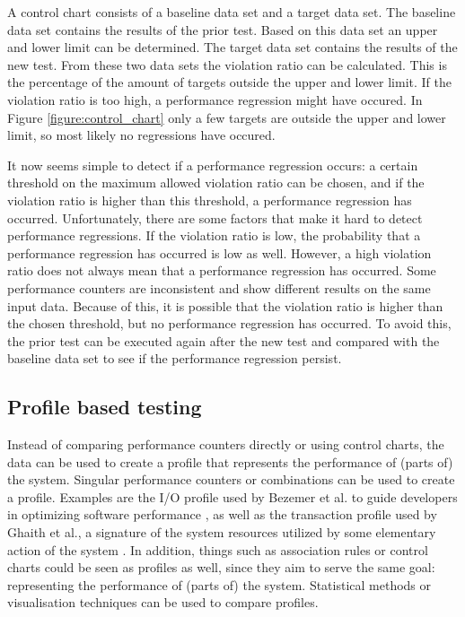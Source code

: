 A control chart consists of a baseline data set and a target data set. The baseline data set contains the results of the prior test. Based on this data set an upper and lower limit can be determined. The target data set contains the results of the new test. From these two data sets the violation ratio can be calculated. This is the percentage of the amount of targets outside the upper and lower limit. If the violation ratio is too high, a performance regression might have occured. In Figure \ref{figure:control_chart} only a few targets are outside the upper and lower limit, so most likely no regressions have occured.

It now seems simple to detect if a performance regression occurs: a certain threshold on the maximum allowed violation ratio can be chosen, and if the violation ratio is higher than this threshold, a performance regression has occurred. Unfortunately, there are some factors that make it hard to detect performance regressions. If the violation ratio is low, the probability that a performance regression has occurred is low as well. However, a high violation ratio does not always mean that a performance regression has occurred. Some performance counters are inconsistent and show different results on the same input data. Because of this, it is possible that the violation ratio is higher than the chosen threshold, but no performance regression has occurred. To avoid this, the prior test can be executed again after the new test and compared with the baseline data set to see if the performance regression persist.

\subsection{Profile based testing}
Instead of comparing performance counters directly or using control charts, the data can be used to create a profile that represents the performance of (parts of) the system. Singular performance counters or combinations can be used to create a profile. Examples are the I/O profile used by Bezemer et al. to guide developers in optimizing software performance \cite{bezemer2014detecting}, as well as the transaction profile used by Ghaith et al., a signature of the system resources utilized by some elementary action of the system \cite{ghaith2013profile}. In addition, things such as association rules or control charts could be seen as profiles as well, since they aim to serve the same goal: representing the performance of (parts of) the system. Statistical methods or visualisation techniques can be used to compare profiles.

